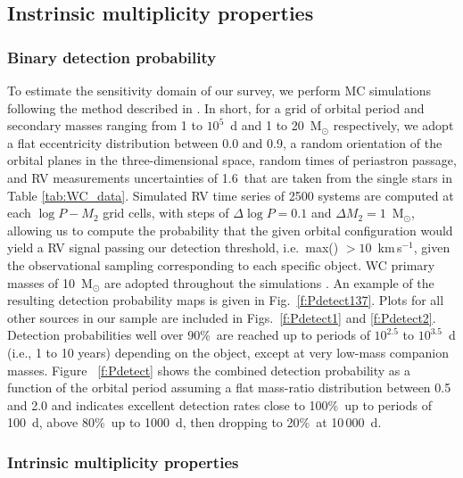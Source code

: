 \subsection{Instrinsic multiplicity properties}\label{s:intMultiplicityProp}
\subsubsection{Binary detection probability}\label{s:detect}
To estimate the sensitivity domain of our survey, we perform MC simulations following the method described in \citet{patrick_red_2019}. In short, for a grid of orbital period and secondary masses ranging from 1 to $10^5$~d and 1 to 20~M$_{\odot}$ respectively, we adopt a flat eccentricity distribution between 0.0 and 0.9, a random orientation of the orbital planes in the three-dimensional space, random times of periastron passage, and RV measurements uncertainties of 1.6\,\kms{} that are taken from the single stars in Table \ref{tab:WC_data}. Simulated RV time series of 2500 systems are computed at each $\log P - M_2$ grid cells, with steps of $\Delta \log P =0.1$ and $\Delta M_2=1$~M$_{\odot}$, allowing us to compute the probability that the given orbital configuration would yield a RV signal passing our detection threshold, i.e.\ max(\DelRV{}) $> 10$~km\,s$^{-1}$, given the observational sampling corresponding to each specific object. WC primary masses of 10~M$_{\odot}$ are adopted throughout the simulations \citep[average of the sample is {$\sim$}13\,\Msun{}][]{massey_spectroscopic_1981,lefevre_spectroscopic_2005,sander_galactic_2019,thomas_orbit_2021}. An example of the resulting detection probability maps is given in Fig.~\ref{f:Pdetect137}. Plots for all other sources in our sample are included in Figs.~\ref{f:Pdetect1} and \ref{f:Pdetect2}. Detection probabilities well over 90\%\ are reached up to periods of $10^{2.5}$ to $10^{3.5}$~d (i.e., 1 to 10 years) depending on the object, except at very low-mass companion masses. Figure ~\ref{f:Pdetect} shows the combined detection probability as a function of the orbital period assuming a flat mass-ratio distribution between 0.5 and 2.0 \citep[e.g., as in][]{langer_properties_2020} and indicates excellent detection rates close to 100\%\ up to periods of 100~d, above 80\%\ up to 1000~d, then dropping to 20\%\ at 10\,000~d.
\subsubsection{Intrinsic multiplicity properties}\label{subs:intMulProp}

